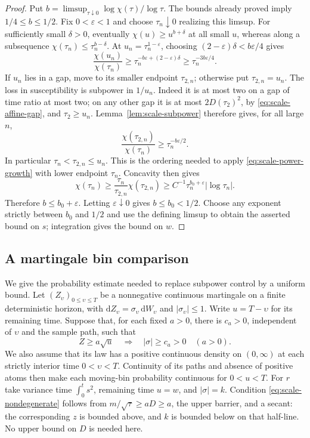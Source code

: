 \documentclass[11pt,a4paper]{article}
\numberwithin{equation}{section}
\theoremstyle{definition}
\theoremstyle{remark}
\newcommand{\dd}{\mathrm d}
\newcommand{\eps}{\varepsilon}
\begin{document}
\begin{proof}
Put $b=\limsup_{\tau\downarrow0}\log\chi(\tau)/\log\tau$.
The bounds already proved imply $1/4\le b\le1/2$.
Fix $0<\eps<1$ and choose $\tau_n\downarrow0$ realizing this limsup.
For sufficiently small $\delta>0$, eventually
$\chi(u)\ge u^{b+\delta}$ at all small $u$, whereas along a
subsequence $\chi(\tau_n)\le\tau_n^{b-\delta}$.
At $u_n=\tau_n^{1-\eps}$, choosing
$(2-\eps)\delta<b\eps/4$ gives
\[
 \frac{\chi(u_n)}{\chi(\tau_n)}
 \ge \tau_n^{-b\eps+(2-\eps)\delta}
 \ge \tau_n^{-3b\eps/4}.
\]
If $u_n$ lies in a gap, move to its smaller endpoint $\tau_{2,n}$;
otherwise put $\tau_{2,n}=u_n$. The loss in susceptibility is
subpower in $1/u_n$. Indeed it is at most two on a gap of time ratio
at most two; on any other gap it is at most $2D(\tau_2)^2$, by
\eqref{eq:scale-affine-gap}, and $\tau_2\ge u_n$.
Lemma~\ref{lem:scale-subpower} therefore gives, for all large $n$,
\[
 \frac{\chi(\tau_{2,n})}{\chi(\tau_n)}
       \ge \tau_n^{-b\eps/2}.
\]
In particular $\tau_n<\tau_{2,n}\le u_n$. This is the ordering
needed to apply \eqref{eq:scale-power-growth} with lower endpoint
$\tau_n$. Concavity then gives
\[
 \chi(\tau_n)\ge\frac{\tau_n}{\tau_{2,n}}\chi(\tau_{2,n})
 \ge C^{-1}\tau_n^{b_0+\eps}|\log\tau_n|.
\]
Therefore $b\le b_0+\eps$. Letting $\eps\downarrow0$ gives
$b\le b_0<1/2$. Choose any exponent strictly between $b_0$ and
$1/2$ and use the defining limsup to obtain the asserted bound on $s$;
integration gives the bound on $w$.
\end{proof}

\subsection{A martingale bin comparison}

We give the probability estimate needed to replace subpower control
by a uniform bound. Let $(Z_\upsilon)_{0\le\upsilon\le T}$ be a nonnegative
continuous martingale on a finite deterministic horizon, with
$\dd Z_\upsilon=\sigma_\upsilon\,\dd W_\upsilon$ and
$|\sigma_\upsilon|\le1$. Write $u=T-\upsilon$
for its remaining time. Suppose that, for each fixed $a>0$, there is
$c_a>0$, independent of $\upsilon$ and the sample path, such that
\begin{equation}\label{eq:scale-nondegenerate}
 Z\ge a\sqrt u\quad\Longrightarrow\quad |\sigma|\ge c_a>0
 \quad(a>0).
\end{equation}
We also assume that its law has a positive continuous density on
$(0,\infty)$ at each strictly interior time $0<\upsilon<T$.
Continuity of its paths
and absence of positive atoms then make each moving-bin probability
continuous for $0<u<T$.
For $r$ take variance time $\int_0^t s^2$, remaining time $u=w$,
and $|\sigma|=k$. Condition \eqref{eq:scale-nondegenerate} follows
from $m/\sqrt\tau\ge aD\ge a$, the upper barrier, and a secant:
the corresponding $z$ is bounded above, and $k$ is bounded below on
that half-line. No upper bound on $D$ is needed here.
\end{document}
